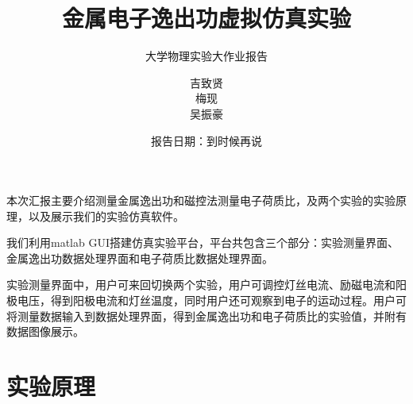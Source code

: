\documentclass{beamer}
\title{金属电子逸出功虚拟仿真实验}
\subtitle{大学物理实验大作业报告}
\author{吉致贤\\梅现\\吴振豪}
\date{报告日期：到时候再说}
\begin{document}
    
    \maketitle

    \begin{frame}
    本次汇报主要介绍测量金属逸出功和磁控法测量电子荷质比，及两个实验的实验原理，以及展示我们的实验仿真软件。

    我们利用matlab GUI搭建仿真实验平台，平台共包含三个部分：实验测量界面、金属逸出功数据处理界面和电子荷质比数据处理界面。
    
    实验测量界面中，用户可来回切换两个实验，用户可调控灯丝电流、励磁电流和阳极电压，得到阳极电流和灯丝温度，同时用户还可观察到电子的运动过程。用户可将测量数据输入到数据处理界面，得到金属逸出功和电子荷质比的实验值，并附有数据图像展示。
    \end{frame}

    \section{实验原理}
\end{document}
